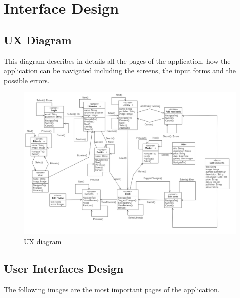 \chapter{Interface Design}
\section{UX Diagram}
This diagram describes in details all the pages of the application, how the application can
be navigated including the screens, the input forms and the possible errors.
\begin{figure}[!ht]
    \centering
	\includegraphics[scale=0.34]{images/ux-diagram.png}
	\caption{UX diagram}
	\label{fig:uxdiagram}
\end{figure}
\clearpage

\section{User Interfaces Design}
The following images are the most important pages of the application.

